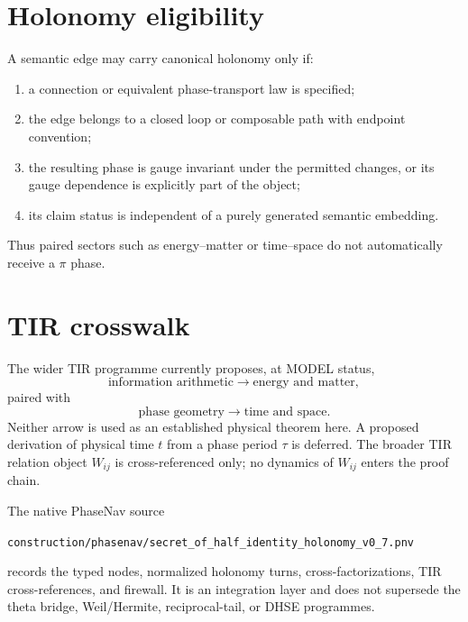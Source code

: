 \section{Holonomy eligibility}
\begin{criterion}
\label{crit:holonomy-eligibility}
A semantic edge may carry canonical holonomy only if:
\begin{enumerate}[label=(H\arabic*)]
 \item a connection or equivalent phase-transport law is specified;
 \item the edge belongs to a closed loop or composable path with endpoint convention;
 \item the resulting phase is gauge invariant under the permitted changes, or
 its gauge dependence is explicitly part of the object;
 \item its claim status is independent of a purely generated semantic embedding.
\end{enumerate}
\end{criterion}
Thus paired sectors such as energy--matter or time--space do not automatically
receive a $\pi$ phase.

\section{TIR crosswalk}
The wider TIR programme currently proposes, at MODEL status,
\[
 \text{information arithmetic}\longrightarrow\text{energy and matter},
\]
paired with
\[
 \text{phase geometry}\longrightarrow\text{time and space}.
\]
Neither arrow is used as an established physical theorem here. A proposed
derivation of physical time $t$ from a phase period $\tau$ is deferred. The
broader TIR relation object $W_{ij}$ is cross-referenced only; no dynamics of
$W_{ij}$ enters the proof chain.

The native PhaseNav source
\begin{center}
\texttt{construction/phasenav/secret\_of\_half\_identity\_holonomy\_v0\_7.pnv}
\end{center}
records the typed nodes, normalized holonomy turns, cross-factorizations, TIR
cross-references, and firewall. It is an integration layer and does not
supersede the theta bridge, Weil/Hermite, reciprocal-tail, or DHSE programmes.

